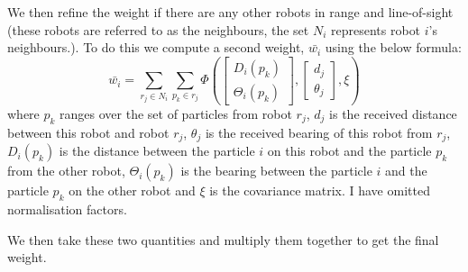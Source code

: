 \documentclass[10pt,a4paper]{article}
\begin{document}
We then refine the weight if there are any other robots in range and line-of-sight (these robots are referred to as the neighbours, the set $N_i$ represents robot $i$'s neighbours.). To do this we compute a second weight, $\bar{w_i}$ using the below formula:
\[
	\bar{w_i} = \sum_{r_j \in N_i}\sum_{p_k \in r_j}\Phi\left(
	\begin{bmatrix}
		D_i(p_k)\\
		\Theta_i(p_k)
	\end{bmatrix},
	\begin{bmatrix}
		d_j\\
		\theta_j
	\end{bmatrix},
	\xi
	\right)
\]
where $p_k$ ranges over the set of particles from robot $r_j$, $d_j$ is the received distance between this robot and robot $r_j$, $\theta_j$ is the received bearing of this robot from $r_j$, $D_i(p_k)$ is the distance between the particle $i$ on this robot and the particle $p_k$ from the other robot, $\Theta_i(p_k)$ is the bearing between the particle $i$ and the particle $p_k$ on the other robot and $\xi$ is the covariance matrix. I have omitted normalisation factors.

We then take these two quantities and multiply them together to get the final weight.
\end{document}
